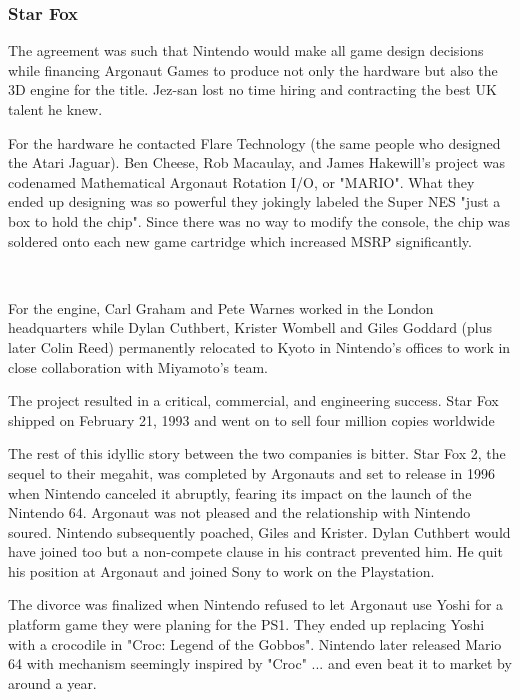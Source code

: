 \subsubsection{Star Fox}
The agreement was such that Nintendo would make all game design decisions while financing Argonaut Games to produce not only the hardware but also the 3D engine for the title. Jez-san lost no time hiring and contracting the best UK talent he knew.\\
\par
For the hardware he contacted Flare Technology (the same people who designed the Atari Jaguar). Ben Cheese, Rob Macaulay, and James Hakewill's project was codenamed Mathematical Argonaut Rotation I/O, or "MARIO". What they ended up designing was so powerful they jokingly labeled the Super NES "just a box to hold the chip". Since there was no way to modify the console, the chip was soldered onto each new game cartridge which increased MSRP significantly.\\
\par
{}\\
\par
For the engine, Carl Graham and Pete Warnes worked in the London headquarters while Dylan Cuthbert, Krister Wombell and Giles Goddard (plus later Colin Reed) permanently relocated to Kyoto in Nintendo's offices to work in close collaboration with Miyamoto's team.\\ 
\par
The project resulted in a critical, commercial, and engineering success. Star Fox shipped on February 21, 1993 and went on to sell four million copies worldwide\\
 \par

The rest of this idyllic story between the two companies is bitter. Star Fox 2, the sequel to their megahit, was completed by Argonauts and set to release in 1996 when Nintendo canceled it abruptly, fearing its impact on the launch of the Nintendo 64. Argonaut was not pleased and the relationship with Nintendo soured. Nintendo subsequently poached, Giles and Krister. Dylan Cuthbert would have joined too but a non-compete clause in his contract prevented him. He quit his position at Argonaut and joined Sony to work on the Playstation.\\
\par
The divorce was finalized when Nintendo refused to let Argonaut use Yoshi for a platform game they were planing for the PS1. They ended up replacing Yoshi with a crocodile in "Croc: Legend of the Gobbos". Nintendo later released Mario 64 with mechanism seemingly inspired by "Croc" ... and even beat it to market by around a year.





